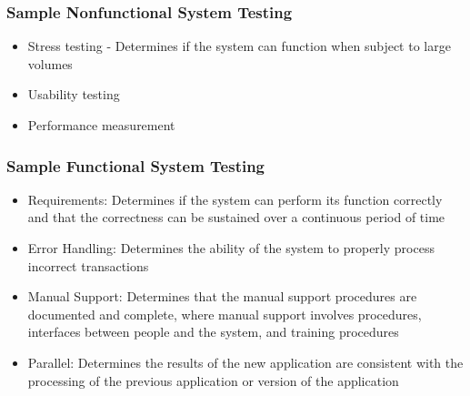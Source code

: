 \documentclass[t,12pt,numbers,fleqn]{beamer}
\begin{document}

\begin{frame}
\frametitle{Sample Nonfunctional System Testing}
\begin{itemize}
\item Stress testing - Determines if the system can function when subject to large volumes
\item Usability testing
\item Performance measurement
\end{itemize}
\end{frame}


\begin{frame}
\frametitle{Sample Functional System Testing}
\begin{itemize}
\item Requirements: Determines if the system can perform its function correctly and that the correctness can be
sustained over a continuous period of time
\item Error Handling: Determines the ability of the system to properly process
  incorrect transactions
\item Manual Support: Determines that the manual support procedures are documented and complete, where manual support
involves procedures, interfaces between people and the system, and training procedures
\item Parallel: Determines the results of the new application are consistent with the processing of the previous
application or version of the application
\end{itemize}
\end{frame}

\end{document}
